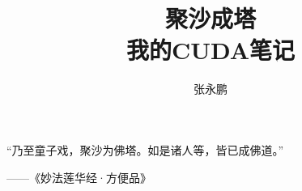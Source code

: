 \documentclass[12pt,a4paper]{book}
\title{{\huge 聚沙成塔} \\ 我的CUDA笔记}%
\author{张永鹏} %
\begin{document}
 
\clearpage
 
\maketitle %

\begin{center}
\vspace*{4in}
\large{
“乃至童子戏，聚沙为佛塔。如是诸人等，皆已成佛道。”\\
            \par\par\par\par\par\par \par\par\par\par                          ------《妙法莲华经·方便品》
}
\end{center}

% 



 
\end{document}
